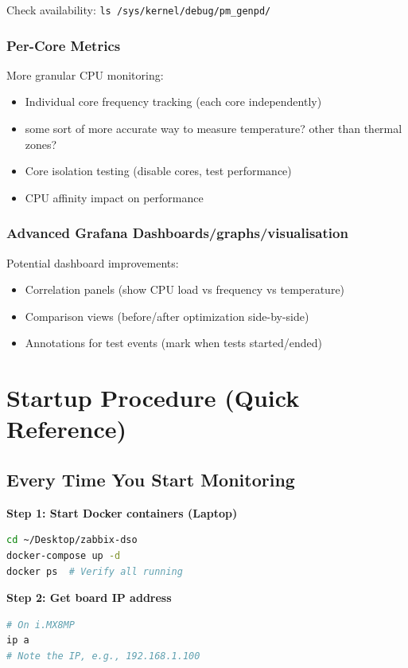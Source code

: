 \documentclass[12pt,a4paper]{report}
\begin{document}
Check availability: \texttt{ls /sys/kernel/debug/pm\_genpd/}

\subsubsection{Per-Core Metrics}

More granular CPU monitoring:
\begin{itemize}
    \item Individual core frequency tracking (each core independently)
    \item some sort of more accurate way to measure temperature? other than thermal zones?
    \item Core isolation testing (disable cores, test performance)
    \item CPU affinity impact on performance
\end{itemize}

\subsubsection{Advanced Grafana Dashboards/graphs/visualisation}

Potential dashboard improvements:
\begin{itemize}
    \item Correlation panels (show CPU load vs frequency vs temperature)
    \item Comparison views (before/after optimization side-by-side)
    \item Annotations for test events (mark when tests started/ended)
\end{itemize}

\section{Startup Procedure (Quick Reference)}

\subsection{Every Time You Start Monitoring}

\textbf{Step 1: Start Docker containers (Laptop)}
\begin{lstlisting}[language=bash]
cd ~/Desktop/zabbix-dso
docker-compose up -d
docker ps  # Verify all running
\end{lstlisting}

\textbf{Step 2: Get board IP address}
\begin{lstlisting}[language=bash]
# On i.MX8MP
ip a
# Note the IP, e.g., 192.168.1.100
\end{lstlisting}
\end{document}
